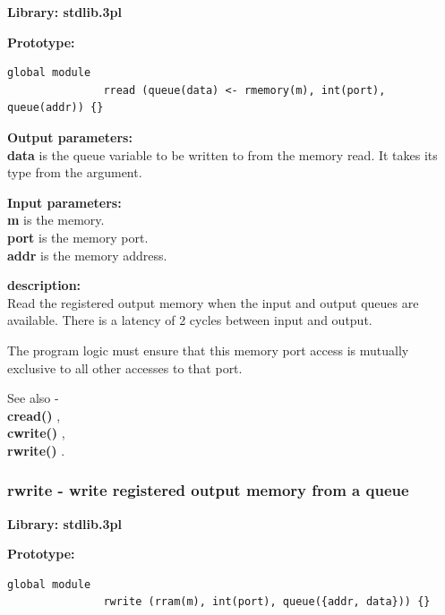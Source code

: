             {\bf Library: stdlib.3pl}

            {\bf Prototype:} \\
            \vsp
            \begin{lstlisting}[gobble=12, language=threepl]
               global module
               rread (queue(data) <- rmemory(m), int(port), queue(addr)) {}
            \end{lstlisting}

            {\bf Output parameters:} \\
            {\bf data} is the queue variable to be written to from the memory
            read. It takes its type from the argument.

            {\bf Input parameters:} \\
            {\bf m} is the memory.\\
            {\bf port} is the memory port.\\
            {\bf addr} is the memory address.

            {\bf description:} \\
            Read the registered output memory when the input and output
            queues are available. There is a latency of 2 cycles between input
            and output.
            
            The program logic must ensure that this
            memory port access is mutually exclusive to all other accesses
            to that port.
            
            See also - \\
            {\bf cread()} , \\
            {\bf cwrite()} , \\
            {\bf rwrite()} .


        \subsubsection{rwrite - write registered output memory from a
                                                    queue}\label{sec:lmrwrite}

            {\bf Library: stdlib.3pl}

            {\bf Prototype:} \\
            \vsp
            \begin{lstlisting}[gobble=12, language=threepl]
               global module
               rwrite (rram(m), int(port), queue({addr, data})) {}
            \end{lstlisting}

